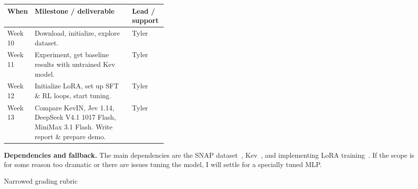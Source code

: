 \documentclass[10pt,letterpaper]{article}
\makeatletter
\renewcommand{\section}{\@startsection{section}{1}{0pt}
  {1.5ex plus 0.3ex minus 0.2ex}{0.7ex plus 0.2ex}
  {\normalfont\large\bfseries}}
\makeatother
\begin{document}
\begin{tabularx}{\linewidth}{@{}p{0.16\linewidth} X p{0.22\linewidth}@{}}
  \hline
  \textbf{When} & \textbf{Milestone / deliverable} & \textbf{Lead / support} \\
  \hline
  Week 10 & Download, initialize, explore dataset. & Tyler \\
  Week 11 & Experiment, get baseline results with untrained Kev model. & Tyler \\
  Week 12 & Initialize LoRA, set up SFT \& RL loops, start tuning. & Tyler \\
  Week 13 & Compare KevIN, Jev 1.14, DeepSeek V4.1 1017 Flash, MiniMax 3.1 Flash. Write report \& prepare demo. & Tyler \\
  \hline
\end{tabularx}

\textbf{Dependencies and fallback.}
The main dependencies are the SNAP dataset~\cite{wikispeedia}, Kev~\cite{kev}, and implementing LoRA training~\cite{lora}.
If the scope is for some reason too dramatic or there are issues tuning the model, I will settle for a specially tuned MLP.

\section{Narrowed grading rubric}
\end{document}
